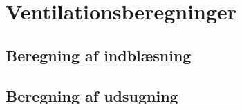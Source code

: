 \section{Ventilationsberegninger}
\label{sec:ventilationsberegninger}

\subsection{Beregning af indblæsning}
\label{sub:indblaesning_beregning}


\subsection{Beregning af udsugning}
\label{sub:udsugning_beregning}